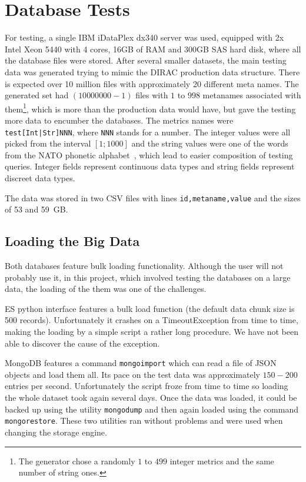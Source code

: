 
\section{Database Tests}

For testing, a single IBM iDataPlex dx340 server was used, equipped with 2x Intel Xeon 5440 with 4 cores, 16GB
of RAM and 300GB SAS hard disk, where all the database files were stored. After several smaller datasets, 
the main testing data was generated trying to mimic the DIRAC production data structure. There is expected 
over 10 million files with approximately 20 different meta names.
The generated set had $(10 000 000 - 1)$ files with $1$ to $998$ metanames associated with them\footnote{ 
The generator chose a randomly $1$ to $499$ integer metrics and the same number of string ones.}, which is more
than the production data would have, but gave the testing more data to encumber the databases.
The metrics names were \texttt{test[Int|Str]NNN}, where \texttt{NNN} stands for a number. The
integer values were all picked from the interval $[1;1000]$ and the string values were one of the
words from the NATO phonetic alphabet~\cite{NATO}, which lead to easier composition of testing queries. 
Integer fields represent continuous data types and string fields represent discreet data types.

The data was stored in two CSV files with lines \texttt{id,metaname,value} and the sizes of 53 and 59~GB.

\subsection{Loading the Big Data}

Both databases feature bulk loading functionality. Although the user will not probably use it, in
this project, which involved testing the databases on a large data, the loading of the them was one 
of the challenges.

ES python interface features a bulk load function (the default data chunk size is 500 records). 
Unfortunately it crashes on a TimeoutException from time to time, making the loading by a simple script a rather long 
procedure. We have not been able to discover the cause of the exception.

MongoDB features a command \texttt{mongoimport} which can read a file of JSON objects and load
them all. Its pace on the test data was approximately $150-200$ entries per second. Unfortunately 
the script froze from time to time so loading the whole dataset took again several days. Once the data was
loaded, it could be backed up using the utility \texttt{mongodump} and then again loaded using the 
command \texttt{mongorestore}. These two utilities ran without problems and were used when changing the 
storage engine.

